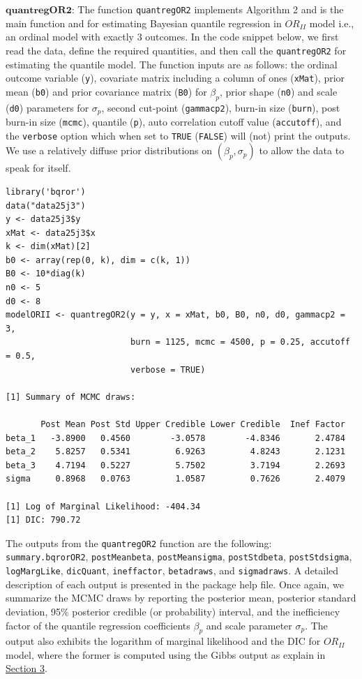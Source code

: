 \(\textbf{quantregOR2}\): The function \texttt{quantregOR2} implements Algorithm 2 and is the main function and for estimating Bayesian quantile regression in \(OR_{II}\) model i.e., an ordinal model with exactly 3 outcomes. In the code snippet below, we first read the data, define the required quantities, and then call the \texttt{quantregOR2} for estimating the quantile model. The function inputs are as follows: the ordinal outcome variable (\texttt{y}), covariate matrix including a column of ones (\texttt{xMat}), prior mean (\texttt{b0}) and prior covariance matrix (\texttt{B0}) for \(\beta_{p}\), prior shape (\texttt{n0}) and scale (\texttt{d0}) parameters for \(\sigma_{p}\), second cut-point (\texttt{gammacp2}), burn-in size (\texttt{burn}), post burn-in size (\texttt{mcmc}), quantile (\texttt{p}), auto correlation cutoff value (\texttt{accutoff}), and the \texttt{verbose} option which when set to \texttt{TRUE} (\texttt{FALSE}) will (not) print the outputs. We use a relatively diffuse prior distributions on \((\beta_{p}, \sigma_{p})\) to allow the data to speak for itself.

\begin{verbatim}
library('bqror')
data("data25j3")
y <- data25j3$y
xMat <- data25j3$x
k <- dim(xMat)[2]
b0 <- array(rep(0, k), dim = c(k, 1))
B0 <- 10*diag(k)
n0 <- 5
d0 <- 8
modelORII <- quantregOR2(y = y, x = xMat, b0, B0, n0, d0, gammacp2 = 3,
                         burn = 1125, mcmc = 4500, p = 0.25, accutoff = 0.5,
                         verbose = TRUE)

[1] Summary of MCMC draws:

       Post Mean Post Std Upper Credible Lower Credible  Inef Factor
beta_1   -3.8900   0.4560        -3.0578        -4.8346       2.4784
beta_2    5.8257   0.5341         6.9263         4.8243       2.1231
beta_3    4.7194   0.5227         5.7502         3.7194       2.2693
sigma     0.8968   0.0763         1.0587         0.7626       2.4079

[1] Log of Marginal Likelihood: -404.34
[1] DIC: 790.72
\end{verbatim}

The outputs from the \texttt{quantregOR2} function are the following: \texttt{summary.bqrorOR2}, \texttt{postMeanbeta}, \texttt{postMeansigma}, \texttt{postStdbeta}, \texttt{postStdsigma}, \texttt{logMargLike}, \texttt{dicQuant}, \texttt{ineffactor}, \texttt{betadraws}, and \texttt{sigmadraws}. A detailed description of each output is presented in the  package help file. Once again, we summarize the MCMC draws by reporting the posterior mean, posterior standard deviation, 95\% posterior credible (or probability) interval, and the inefficiency factor of the quantile regression coefficients \(\beta_{p}\) and scale parameter \(\sigma_{p}\). The output also exhibits the logarithm of marginal likelihood and the DIC for \(OR_{II}\) model, where the former is computed using the Gibbs output as explain in \protect\hyperlink{sec:ML}{Section 3}.

